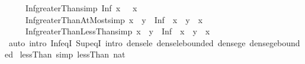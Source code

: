 \begin{isabellebody}
\ \ \ \ \ Inf{\isacharunderscore}{\kern0pt}greaterThan{\isacharbrackleft}{\kern0pt}simp{\isacharbrackright}{\kern0pt}{\isacharcolon}{\kern0pt}\ {\isachardoublequoteopen}Inf\ {\isacharbraceleft}{\kern0pt}x\ {\isacharless}{\kern0pt}{\isachardot}{\kern0pt}{\isachardot}{\kern0pt}{\isacharbraceright}{\kern0pt}\ {\isacharequal}{\kern0pt}\ x{\isachardoublequoteclose}\isanewline
\ \ \ \ \ Inf{\isacharunderscore}{\kern0pt}greaterThanAtMost{\isacharbrackleft}{\kern0pt}simp{\isacharbrackright}{\kern0pt}{\isacharcolon}{\kern0pt}\ {\isachardoublequoteopen}x\ {\isacharless}{\kern0pt}\ y\ {\isasymLongrightarrow}\ Inf\ {\isacharbraceleft}{\kern0pt}\ x\ {\isacharless}{\kern0pt}{\isachardot}{\kern0pt}{\isachardot}{\kern0pt}\ y{\isacharbraceright}{\kern0pt}\ {\isacharequal}{\kern0pt}\ x{\isachardoublequoteclose}\isanewline
\ \ \ \ \ Inf{\isacharunderscore}{\kern0pt}greaterThanLessThan{\isacharbrackleft}{\kern0pt}simp{\isacharbrackright}{\kern0pt}{\isacharcolon}{\kern0pt}\ {\isachardoublequoteopen}x\ {\isacharless}{\kern0pt}\ y\ {\isasymLongrightarrow}\ Inf\ {\isacharbraceleft}{\kern0pt}\ x\ {\isacharless}{\kern0pt}{\isachardot}{\kern0pt}{\isachardot}{\kern0pt}{\isacharless}{\kern0pt}\ y{\isacharbraceright}{\kern0pt}\ {\isacharequal}{\kern0pt}\ x{\isachardoublequoteclose}\isanewline
%
\isadelimproof
\ \ %
\endisadelimproof
%
\isatagproof
{}\isamarkupfalse%
\ {\isacharparenleft}{\kern0pt}auto\ intro{\isacharbang}{\kern0pt}{\isacharcolon}{\kern0pt}\ Inf{\isacharunderscore}{\kern0pt}eqI\ Sup{\isacharunderscore}{\kern0pt}eqI\ intro{\isacharcolon}{\kern0pt}\ dense{\isacharunderscore}{\kern0pt}le\ dense{\isacharunderscore}{\kern0pt}le{\isacharunderscore}{\kern0pt}bounded\ dense{\isacharunderscore}{\kern0pt}ge\ dense{\isacharunderscore}{\kern0pt}ge{\isacharunderscore}{\kern0pt}bounded{\isacharparenright}{\kern0pt}%
\endisatagproof
{\isafoldproof}%
%
\isadelimproof
%
\endisadelimproof
%
\isadelimdocument
%
\endisadelimdocument
%
\isatagdocument
%
\isamarkuptrue%
%
\isamarkuptrue%
%
\endisatagdocument
{\isafolddocument}%
%
\isadelimdocument
%
\endisadelimdocument
{}\isamarkupfalse%
\ lessThan{\isacharunderscore}{\kern0pt}{}\ {\isacharbrackleft}{\kern0pt}simp{\isacharbrackright}{\kern0pt}{\isacharcolon}{\kern0pt}\ {\isachardoublequoteopen}lessThan\ {\isacharparenleft}{\kern0pt}{}{\isacharcolon}{\kern0pt}{\isacharcolon}{\kern0pt}nat{\isacharparenright}{\kern0pt}\ {\isacharequal}{\kern0pt}\ {\isacharbraceleft}{\kern0pt}{\isacharbraceright}{\kern0pt}{\isachardoublequoteclose}\isanewline

\end{isabellebody}
